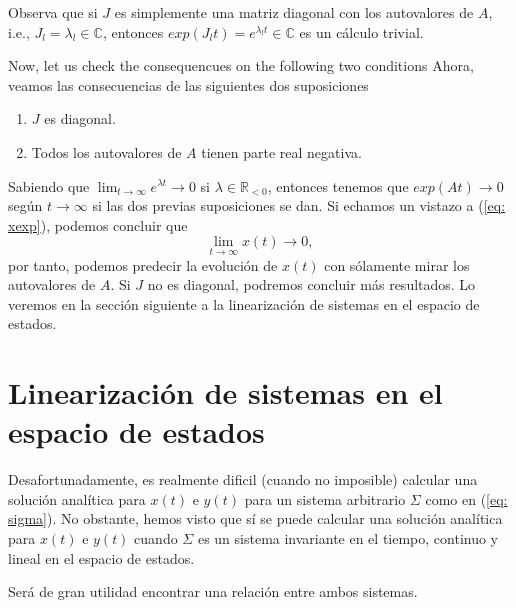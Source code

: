 Observa que si $J$ es simplemente una matriz diagonal con los autovalores de $A$, i.e., $J_l = \lambda_l \in \mathbb{C}$, entonces $exp(J_lt) = e^{\lambda_lt} \in\mathbb{C}$ es un cálculo trivial.

Now, let us check the consequencues on the following two conditions
Ahora, veamos las consecuencias de las siguientes dos suposiciones
\begin{enumerate}
	\item $J$ es diagonal.
	\item Todos los autovalores de $A$ tienen parte real negativa.
\end{enumerate}

Sabiendo que $\lim_{t\to\infty} e^{\lambda t} \to 0$ si $\lambda \in \mathbb{R}_{<0}$, entonces tenemos que $exp(At) \to 0$ según $t\to\infty$ si las dos previas suposiciones se dan. Si echamos un vistazo a (\ref{eq: xexp}), podemos concluir que 
\begin{equation}
	\lim_{t\to\infty} x(t) \to 0,
	\label{eq: xlim}
\end{equation}
por tanto, podemos predecir la evolución de $x(t)$ con sólamente mirar los autovalores de $A$. Si $J$ no es diagonal, podremos concluir más resultados. Lo veremos en la sección siguiente a la linearización de sistemas en el espacio de estados.


\section{Linearización de sistemas en el espacio de estados}
Desafortunadamente, es realmente dificil (cuando no imposible) calcular una solución analítica para $x(t)$ e $y(t)$ para un sistema arbitrario $\Sigma$ como en (\ref{eq: sigma}). No obstante, hemos visto que sí se puede calcular una solución analítica para $x(t)$ e $y(t)$ cuando $\Sigma$ es un sistema invariante en el tiempo, continuo y lineal en el espacio de estados.

Será de gran utilidad encontrar una relación entre ambos sistemas.

